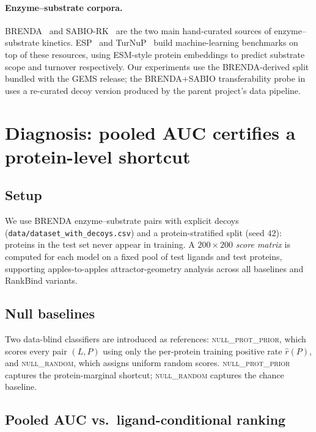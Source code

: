 \documentclass[11pt,a4paper]{article}
\newcommand{\method}{RankBind\xspace}
\newcommand{\nullprior}{\textsc{null\_prot\_prior}\xspace}
\newcommand{\nullrand}{\textsc{null\_random}\xspace}
\begin{document}
\paragraph{Enzyme--substrate corpora.}
BRENDA~\citep{chang2021brenda} and SABIO-RK~\citep{wittig2018sabiork}
are the two main hand-curated sources of enzyme--substrate kinetics.
ESP~\citep{kroll2023esp} and TurNuP~\citep{kroll2023turnup} build
machine-learning benchmarks on top of these resources, using
ESM-style protein embeddings to predict substrate scope and turnover
respectively. Our experiments use the BRENDA-derived split bundled with
the GEMS release; the BRENDA+SABIO transferability probe in
 uses a re-curated decoy version produced by
the parent project's data pipeline.

\section{Diagnosis: pooled AUC certifies a protein-level shortcut}
\label{sec:diagnosis}

\subsection{Setup}
We use BRENDA enzyme--substrate pairs with explicit decoys
(\texttt{data/dataset\_with\_decoys.csv}) and a protein-stratified split
(seed $42$): proteins in the test set never appear in training. A
$200 \times 200$ \emph{score matrix} is computed for each model on a
fixed pool of test ligands and test proteins, supporting apples-to-apples
attractor-geometry analysis across all baselines and \method variants.

\subsection{Null baselines}
Two data-blind classifiers are introduced as references:
\nullprior, which scores every pair $(L, P)$ using only the per-protein
training positive rate $\hat{r}(P)$, and \nullrand, which assigns
uniform random scores. \nullprior captures the protein-marginal
shortcut; \nullrand captures the chance baseline.

\subsection{Pooled AUC vs.\ ligand-conditional ranking}
\end{document}
